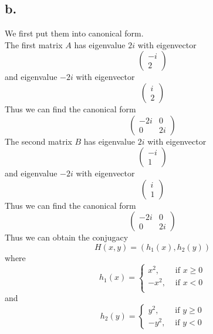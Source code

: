\documentclass[11pt]{article}
\theoremstyle{mystyle}
\theoremstyle{definition}
\begin{document}
\subsection*{b.}
We first put them into canonical form. \\
The first matrix $A$ has eigenvalue $2i$ with eigenvector 
\[
  \begin{pmatrix}
    -i \\
    2
  \end{pmatrix}
\]
and eigenvalue $-2i$ with eigenvector 
\[
  \begin{pmatrix}
    i \\ 
    2
  \end{pmatrix}
\]
Thus we can find the canonical form 
\[
\begin{pmatrix}
  -2i & 0 \\
  0 & 2i
\end{pmatrix}  
\]
The second matrix $B$ has eigenvalue $2i$ with eigenvector 
\[
  \begin{pmatrix}
    -i \\
    1
  \end{pmatrix}
\]
and eigenvalue $-2i$ with eigenvector 
\[
  \begin{pmatrix}
    i \\ 
    1
  \end{pmatrix}
\]
Thus we can find the canonical form 
\[
\begin{pmatrix}
  -2i & 0 \\
  0 & 2i
\end{pmatrix}  
\]
Thus we can obtain the conjugacy
\[
  H(x,y) = (h_1(x), h_2(y))
\]
where 
\[
  h_1(x) = 
  \begin{cases}
    x^2, &\text{ if } x \ge 0\\
    -x^2, &\text{ if } x < 0\\
  \end{cases}
\]
and 
\[
  h_2(y) = 
  \begin{cases}
    y^2, &\text{ if } y \ge 0 \\
    -y^2, &\text{ if } y < 0
  \end{cases}
\]
\end{document}
